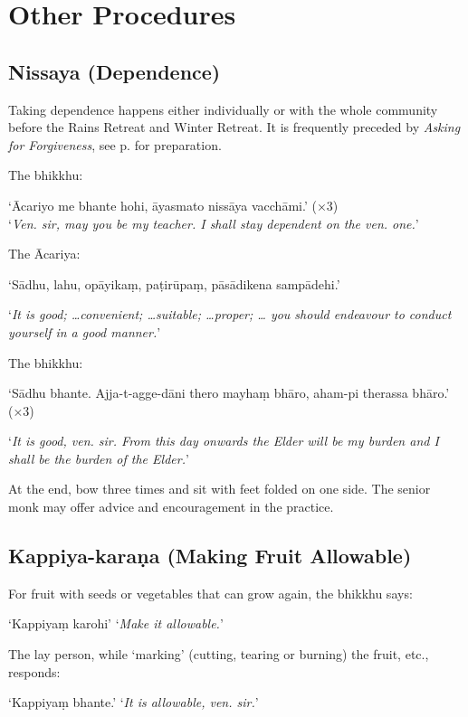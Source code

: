 \chapter{Other Procedures}

\section{Nissaya (Dependence)}
\label{nissaya}

Taking dependence happens either individually or with the whole community before the Rains Retreat and
Winter Retreat. It is frequently preceded by \emph{Asking for Forgiveness}, see
p.\pageref{asking-forgiveness} for preparation.

The bhikkhu:

‘Ācariyo me bhante hohi, āyasmato nissāya vacchāmi.’ (×3)\\
‘\emph{Ven. sir, may you be my teacher. I shall stay dependent on the ven. one.}’

The Ācariya:

‘Sādhu, lahu, opāyikaṃ, paṭirūpaṃ, pāsādikena sampādehi.’

‘\emph{It is good; …convenient; …suitable; …proper; … you should endeavour to
  conduct yourself in a good manner.}’


The bhikkhu:

‘Sādhu bhante. Ajja-t-agge-dāni thero mayhaṃ bhāro, aham-pi therassa bhāro.’ (×3)

‘\emph{It is good, ven. sir. From this day onwards the Elder will be my burden and I
shall be the burden of the Elder.}’


At the end, bow three times and sit with feet folded on one side. The senior monk may offer advice and
encouragement in the practice.

\section{Kappiya-karaṇa (Making Fruit Allowable)}

For fruit with seeds or vegetables that can grow again, the bhikkhu says:

‘Kappiyaṃ karohi’ ‘\emph{Make it allowable.}’

The lay person, while ‘marking’ (cutting, tearing or burning) the fruit, etc., responds:

‘Kappiyaṃ bhante.’ ‘\emph{It is allowable, ven. sir.}’ 

